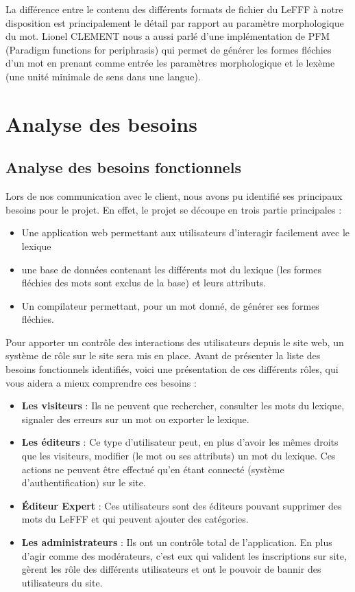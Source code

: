\documentclass[12pt,a4paper]{article}
\begin{document}
La différence entre le contenu des différents formats de fichier du LeFFF à notre disposition est principalement le détail par rapport au paramètre morphologique du mot.
Lionel CLEMENT nous a aussi parlé d'une implémentation de PFM (Paradigm functions for periphrasis) qui permet de générer les formes fléchies d'un mot en prenant comme entrée les paramètres morphologique et le lexème (une unité minimale de sens dans une langue).
\section{Analyse des besoins}
\subsection{Analyse des besoins fonctionnels}
\smallbreak Lors de nos communication avec le client, nous avons pu identifié ses principaux besoins pour le projet. En effet, le projet se découpe en trois partie principales : 
\begin{itemize}  
  \item Une application web permettant aux utilisateurs d'interagir facilement avec le lexique
  \item une base de données contenant les différents mot du lexique (les formes fléchies des mots sont exclus de la base) et leurs attributs.
  \item Un compilateur permettant, pour un mot donné, de générer ses formes fléchies.
\end{itemize}

\smallbreak Pour apporter un contrôle des interactions des utilisateurs depuis le site web, un système de rôle sur le site sera mis en place. Avant de présenter la liste des besoins fonctionnels identifiés, voici une présentation de ces différents rôles, qui vous aidera a mieux comprendre ces besoins : 
\begin{itemize}  
  \item \textbf{Les visiteurs} : Ils ne peuvent que rechercher, consulter les mots du lexique, signaler des erreurs sur un mot ou exporter le lexique.
  \item \textbf{Les éditeurs} : Ce type d'utilisateur peut, en plus d'avoir les mêmes droits que les visiteurs, modifier (le mot ou ses attributs) un mot du lexique. Ces actions ne peuvent être effectué qu'en étant connecté (système d'authentification) sur le site.
  \item \textbf{Éditeur Expert} :  Ces utilisateurs sont des éditeurs pouvant supprimer des mots du LeFFF et qui peuvent ajouter des catégories.
  \item \textbf{Les administrateurs} : Ils ont un contrôle total de l'application. En plus d'agir comme des modérateurs, c'est eux qui valident les inscriptions sur site, gèrent les rôle des différents utilisateurs et ont le pouvoir de bannir des utilisateurs du site.
\end{itemize}
 
\end{document}
